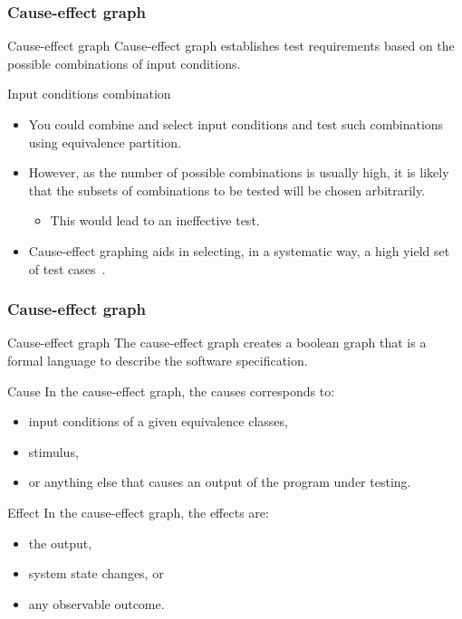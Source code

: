 \begin{frame}[parent={concept:functional-testing}, hasprev=false, hasnext=true]
\frametitle{Cause-effect graph}
\label{concept:case-effect-graph}

\begin{block:concept}{Cause-effect graph}
Cause-effect graph establishes test requirements based on the possible
combinations of input conditions.
\end{block:concept}


\begin{block:fact}{Input conditions combination}
\begin{itemize}
	\item You could combine and select input conditions and test such
	combinations using equivalence partition.

	\item However, as the number of possible combinations is usually high,
	it is likely that the subsets of combinations to be tested will be chosen
	arbitrarily.
	\begin{itemize}
		\item This would lead to an ineffective test.
	\end{itemize}

	\item Cause-effect graphing aids in selecting, in a systematic way,
	a high yield set of test cases~\cite[p.~66]{Myers:2004}.
\end{itemize}
\end{block:fact}
\end{frame}


\begin{frame}[hasprev=true, hasnext=true]
\frametitle{Cause-effect graph}

\begin{block:fact}{Cause-effect graph}
The cause-effect graph creates a boolean graph that is a formal
language to describe the software specification.
\end{block:fact}


\begin{block:fact}{Cause}
In the cause-effect graph, the causes corresponds to:
\begin{itemize}
	\item input conditions of a given equivalence classes,
	\item stimulus,
	\item or anything else that causes an output of the program under
	testing.
\end{itemize}
\end{block:fact}


\begin{block:fact}{Effect}
In the cause-effect graph, the effects are:
\begin{itemize}
	\item the output,
	\item system state changes, or
	\item any observable outcome.
\end{itemize}
\end{block:fact}
\end{frame}


